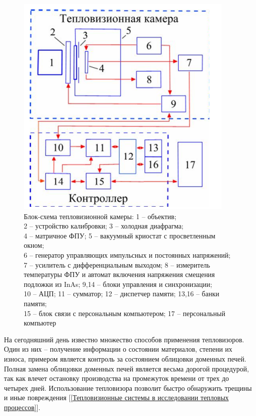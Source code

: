 \documentclass[14pt, a4paper]{extreport}
\begin{document}
	\begin{figure}[h!]
		\centering
		\includegraphics[width = \textwidth]{image/chapter_1/MatrixIRCameraScheme}	
		\caption{Блок-схема тепловизионной камеры: 1 -- объектив;\\2 -- устройство калибровки; 3 -- холодная диафрагма;\\4 -- матричное ФПУ; 5 -- вакуумный криостат с просветленным окном;\\6 -- генератор управляющих импульсных и постоянных напряжений;\\7 -- усилитель с дифференциальным выходом; 8 -- измеритель температуры ФПУ и автомат включения напряжения смещения подложки из InAs; 9,14 -- блоки управления и синхронизации;\\10 -- АЦП; 11 -- сумматор; 12 -- диспетчер памяти; 13,16 -- банки памяти;\\15 -- блок связи с персональным компьютером; 17 -- персональный компьютер}
		\label{fig:MatrixIRCameraScheme}
	\end{figure}
	
	На сегодняшний день известно множество способов применения тепловизоров. Один из них -- получение информации о состоянии материалов, степени их износа, примером является контроль за состоянием облицовки доменных печей. Полная замена облицовки доменных печей является весьма дорогой процедурой, так как влечет остановку производства на промежуток времени от трех до четырех дней. Использование тепловизора позволит быстро обнаружить трещины и иные повреждения [\ref{Тепловизионные системы в исследовании тепловых процессов}].
	
\end{document}
